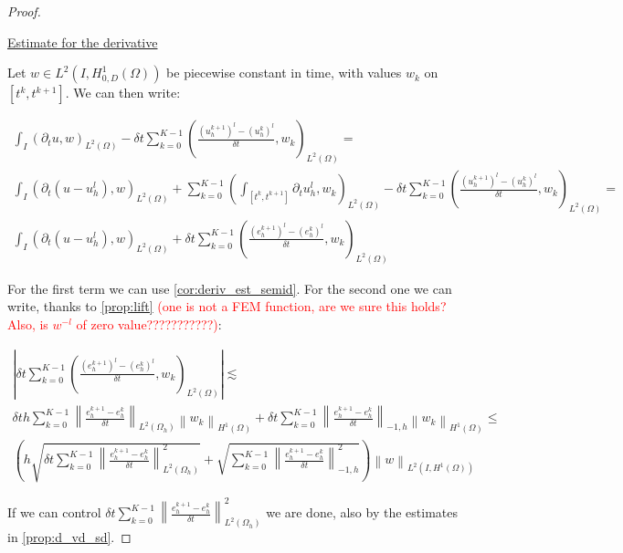 \documentclass[english,a4paper,9pt,oneside]{scrbook}	%
\theoremstyle{break}
\newenvironment{mproof}[1][\proofname]{%
  \begin{proof}[#1]$ $\par\nobreak\ignorespaces
}{%
  \end{proof}
}
\renewcommand*{\proofname}{Proof}
\theoremstyle{remark}
\newcommand{\ds}{\displaystyle}
\newcommand{\norm}[1]{\left\lVert#1\right\rVert}
\begin{document}
\begin{appendices}
\begin{mproof}

\underline{Estimate for the derivative}

Let $w \in L^2(I,H^1_{0,D}(\Omega))$ be piecewise constant in time, with values $w_k$ on $[t^k,t^{k+1}]$. We can then write:

\begin{align*}
	\int_I (\partial_t u , w)_{L^2(\Omega)}-\delta t \sum_{k=0}^{K-1}\left ( \frac{(u^{k+1}_h)^l - (u_h^k)^l}{\delta t} , w_k\right )_{L^2(\Omega)} = \\
	\int_I (\partial_t (u-u_h^l) , w)_{L^2(\Omega)} + \sum_{k=0}^{K-1} \left (\int_{[t^k,t^{k+1}]} \partial_t u_h^l , w_k\right )_{L^2(\Omega)} -\delta t \sum_{k=0}^{K-1}\left ( \frac{(u^{k+1}_h)^l - (u_h^k)^l}{\delta t} , w_k\right )_{L^2(\Omega)} = \\
	\int_I (\partial_t (u-u_h^l) , w)_{L^2(\Omega)} + \delta t \sum_{k=0}^{K-1}\left ( \frac{(e^{k+1}_h)^l - (e_h^k)^l}{\delta t} , w_k\right )_{L^2(\Omega)}
\end{align*}

For the first term we can use \cref{cor:deriv_est_semid}. For the second one we can write, thanks to \cref{prop:lift} \textcolor{red}{(one is not a FEM function, are we sure this holds? Also, is $w^{-l}$ of zero value???????????)}:

\begin{align*}
	\left | \delta t \sum_{k=0}^{K-1}\left ( \frac{(e^{k+1}_h)^l - (e_h^k)^l}{\delta t} , w_k\right )_{L^2(\Omega)}\right | \lesssim \\
	\delta t h \sum_{k=0}^{K-1}\norm{ \frac{e^{k+1}_h - e_h^k}{\delta t}}_{L^2(\Omega_h)} \norm{w_k}_{H^1(\Omega)} + \delta t \sum_{k=0}^{K-1}\norm{ \frac{e^{k+1}_h - e_h^k}{\delta t}}_{-1,h} \norm{w_k}_{H^1(\Omega)} \leq \\
	\left ( h\sqrt{\delta t \sum_{k=0}^{K-1}  \norm{ \frac{e^{k+1}_h - e_h^k}{\delta t}}_{L^2(\Omega_h)}^2}  + \sqrt{ \sum_{k=0}^{K-1}\norm{ \frac{e^{k+1}_h - e_h^k}{\delta t}}_{-1,h}^2}\right ) \norm{w}_{L^2(I,H^1(\Omega))}
\end{align*}

If we can control $\ds \delta t \sum_{k=0}^{K-1} \norm{ \frac{e^{k+1}_h - e_h^k}{\delta t}}_{L^2(\Omega_h)}^2$ we are done, also by the estimates in \cref{prop:d_vd_sd}. 


\end{mproof}
\end{appendices}
\end{document}
